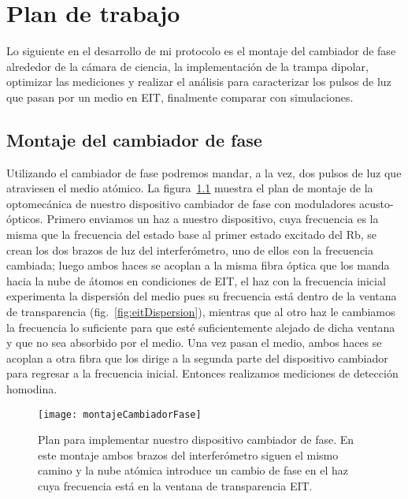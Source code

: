 \chapter{\label{cap:plan}Plan de trabajo}

Lo siguiente en el desarrollo de mi protocolo es el montaje del cambiador de fase alrededor de la cámara de ciencia, la implementación de la trampa dipolar, optimizar las mediciones y realizar el análisis para caracterizar los pulsos de luz que pasan por un medio en EIT, finalmente comparar con simulaciones.

\section{\label{sec:montajeCambiadorFase}Montaje del cambiador de fase}

Utilizando el cambiador de fase podremos mandar, a la vez, dos pulsos de luz que atraviesen el medio atómico. La figura~\ref{fig:montajeCambiadorFase} muestra el plan de montaje de la optomecánica de nuestro dispositivo cambiador de fase con moduladores acusto-ópticos. Primero enviamos un haz a nuestro dispositivo, cuya frecuencia es la misma que la frecuencia del estado base al primer estado excitado del Rb, se crean los dos brazos de luz del interferómetro, uno de ellos con la frecuencia cambiada; luego ambos haces se acoplan a la misma fibra óptica que los manda hacia la nube de átomos en condiciones de EIT, el haz con la frecuencia inicial experimenta la dispersión del medio pues su frecuencia está dentro de la ventana de transparencia (fig.~\ref{fig:eitDispersion}), mientras que al otro haz le cambiamos la frecuencia lo suficiente para que esté suficientemente alejado de dicha ventana y que no sea absorbido por el medio. Una vez pasan el medio, ambos haces se acoplan a otra fibra que los dirige a la segunda parte del dispositivo cambiador para regresar a la frecuencia inicial. Entonces realizamos mediciones de detección homodina.

\begin{figure}[H]
\centering
\begin{minipage}{0.91\textwidth}
\centering
\texttt{[image: montajeCambiadorFase]}
\caption{\label{fig:montajeCambiadorFase}Plan para implementar nuestro dispositivo cambiador de fase. En este montaje ambos brazos del interferómetro siguen el mismo camino y la nube atómica introduce un cambio de fase en el haz cuya frecuencia está en la ventana de transparencia EIT.}
\end{minipage}
\end{figure}

